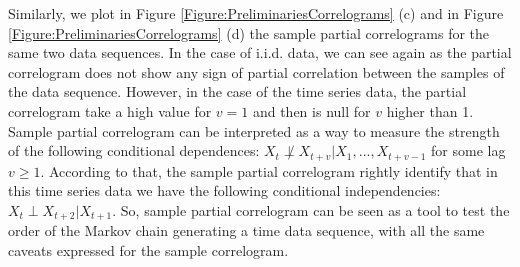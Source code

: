 Similarly, we plot in Figure \ref{Figure:PreliminariesCorrelograms} (c) and  in  Figure \ref{Figure:PreliminariesCorrelograms} (d) the sample partial correlograms for the same two data sequences. In the case of i.i.d. data, we can see again as the partial correlogram does not show any sign of partial correlation between the samples of the data sequence. However, in the case of the time series data, the partial correlogram take a high value for $v=1$ and then is null for $v$ higher than 1. Sample partial correlogram can be interpreted as a way to measure the strength of the following conditional dependences: $X_t  \not\perp X_{t+v} | X_1,...,X_{t+v-1}$ for some lag $v\geq 1$.  According to that, the sample partial correlogram rightly identify that in this time series data we have the following conditional independencies: $X_t\perp X_{t+2}|X_{t+1}$. So, sample partial correlogram can be seen as a tool to test the order of the Markov chain generating a time data sequence, with all the same caveats expressed for the sample correlogram. 

